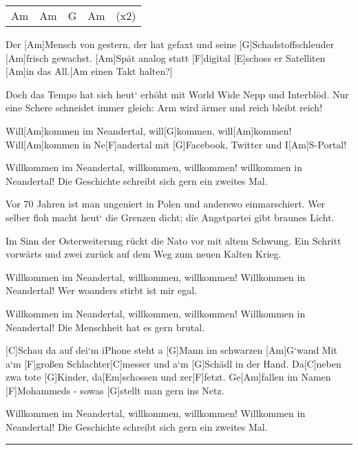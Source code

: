 

\begin{guitar}
	{\footnotesize\begin{tabular}{l|l|l|l l}
			Am & Am & G & Am & (x2)
	\end{tabular}}
	
	Der [Am]Mensch von gestern, der hat gefaxt
	und seine [G]Schadstoffschleuder [Am]frisch gewachst.
	[Am]Spät analog statt [F]digital
	[E]schoss er Satelliten [Am]in das All.[Am einen Takt halten?]{}
	
	Doch das Tempo hat sich heut‘ erhöht
	mit World Wide Nepp und Interblöd.
	Nur eine Schere schneidet immer gleich:
	Arm wird ärmer und reich bleibt reich!
	
	Will[Am]kommen im Neandertal, will[G]kommen, will[Am]kommen!
	Will[Am]kommen in Ne[F]andertal mit [G]Facebook, Twitter und I[Am]S-Portal!
	
	Willkommen im Neandertal, willkommen, willkommen!
	willkommen in Neandertal! Die Geschichte schreibt sich gern ein zweites Mal.
	
	Vor 70 Jahren ist man ungeniert
	in Polen und anderswo einmarschiert.
	Wer selber floh macht heut‘ die Grenzen dicht;
	die Angstpartei gibt braunes Licht.
	
	Im Sinn der Osterweiterung
	rückt die Nato vor mit altem Schwung.
	Ein Schritt vorwärts und zwei zurück
	auf dem Weg zum neuen Kalten Krieg.
	
	Willkommen im Neandertal, willkommen, willkommen!
	Willkommen in Neandertal! Wer woanders stirbt ist mir egal.
	
	Willkommen im Neandertal, willkommen, willkommen!
	Willkommen in Neandertal! Die Menschheit hat es gern brutal.
	
	\pagebreak
	[C]Schau da auf dei‘m iPhone steht a [G]Mann im schwarzen [Am]G‘wand
	Mit a‘m [F]großen Schlachter[C]messer und a‘m [G]Schädl in der Hand.
	Da[C]neben zwa tote [G]Kinder, da[Em]schossen und zer[F]fetzt.
	Ge[Am]fallen im Namen [F]Mohammeds - sowas [G]stellt man gern ins Netz.
	
	Willkommen im Neandertal, willkommen, willkommen!
	Willkommen in Neandertal! Die Geschichte schreibt sich gern ein zweites Mal.
	\hrule
	

\end{guitar}
